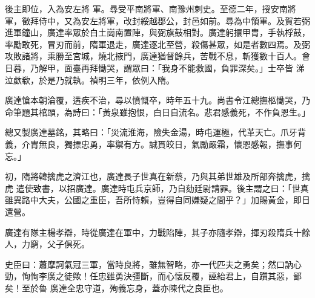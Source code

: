 \begin{pinyinscope}
 後主即位，入為安左將
 軍。尋受平南將軍、南豫州刺史。至德二年，授安南將軍，徵拜侍中，又為安左將軍，改封綏越郡公，封邑如前。尋為中領軍。及賀若弼進軍鐘山，廣達率眾於白土崗南置陣，與弼旗鼓相對。廣達躬擐甲胄，手執桴鼓，率勵敢死，冒刃而前，隋軍退走，廣達逐北至營，殺傷甚眾，如是者數四焉。及弼攻敗諸將，乘勝至宮城，燒北掖門，廣達猶督餘兵，苦戰不息，斬獲數十百人。會日暮，乃解甲，面臺再拜慟哭，謂眾曰：「我身不能救國，負罪深矣。」士卒皆
 涕泣歔欷，於是乃就執。禎明三年，依例入隋。



 廣達愴本朝淪覆，遘疾不治，尋以憤慨卒，時年五十九。尚書令江總撫柩慟哭，乃命筆題其棺頭，為詩曰：「黃泉雖抱恨，白日自流名。悲君感義死，不作負恩生。」



 總又製廣達墓銘，其略曰：「災流淮海，險失金湯，時屯運極，代革天亡。爪牙背義，介胄無良，獨摽忠勇，率禦有方。誠貫皎日，氣勵嚴霜，懷恩感報，撫事何忘。」



 初，隋將韓擒虎之濟江也，廣達長子世真在新蔡，乃與其弟世雄及所部奔擒虎，擒虎
 遣使致書，以招廣達。廣達時屯兵京師，乃自劾廷尉請罪。後主謂之曰：「世真雖異路中大夫，公國之重臣，吾所恃賴，豈得自同嫌疑之間乎？」加賜黃金，即日還營。



 廣達有隊主楊孝辯，時從廣達在軍中，力戰陷陣，其子亦隨孝辯，揮刃殺隋兵十餘人，力窮，父子俱死。



 史臣曰：蕭摩訶氣冠三軍，當時良將，雖無智略，亦一代匹夫之勇矣；然口訥心勁，恂恂李廣之徒歟！任忠雖勇決彊斷，而心懷反覆，誣紿君上，自躓其惡，鄙矣！至於魯
 廣達全忠守道，殉義忘身，蓋亦陳代之良臣也。



\end{pinyinscope}